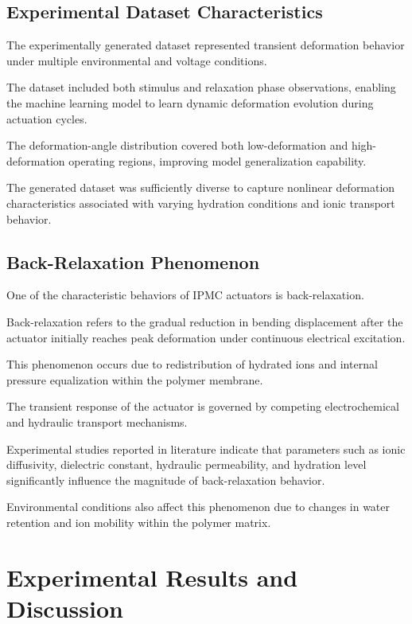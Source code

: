 \documentclass[11pt,a4paper]{article}
\begin{document}
\subsection{Experimental Dataset Characteristics}

The experimentally generated dataset represented transient deformation behavior under multiple environmental and voltage conditions.

The dataset included both stimulus and relaxation phase observations, enabling the machine learning model to learn dynamic deformation evolution during actuation cycles.

The deformation-angle distribution covered both low-deformation and high-deformation operating regions, improving model generalization capability.

The generated dataset was sufficiently diverse to capture nonlinear deformation characteristics associated with varying hydration conditions and ionic transport behavior.

\subsection{Back-Relaxation Phenomenon}

One of the characteristic behaviors of IPMC actuators is back-relaxation.

Back-relaxation refers to the gradual reduction in bending displacement after the actuator initially reaches peak deformation under continuous electrical excitation.

This phenomenon occurs due to redistribution of hydrated ions and internal pressure equalization within the polymer membrane.

The transient response of the actuator is governed by competing electrochemical and hydraulic transport mechanisms.

Experimental studies reported in literature indicate that parameters such as ionic diffusivity, dielectric constant, hydraulic permeability, and hydration level significantly influence the magnitude of back-relaxation behavior.

Environmental conditions also affect this phenomenon due to changes in water retention and ion mobility within the polymer matrix.


\section{Experimental Results and Discussion}
\end{document}
